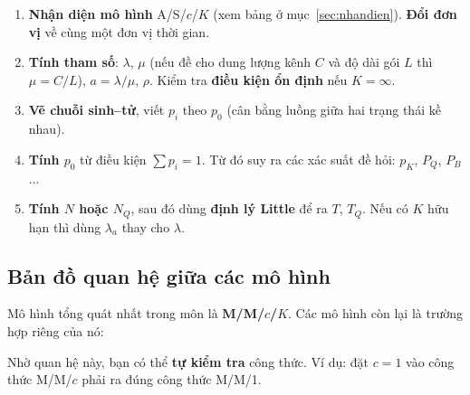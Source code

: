 \begin{tomtat}
\begin{enumerate}[leftmargin=1.6em,label=\textbf{B\arabic*.}]
  \item \textbf{Nhận diện mô hình} A/S/$c$/$K$ (xem bảng ở mục~\ref{sec:nhandien}). \textbf{Đổi đơn vị} về cùng một đơn vị thời gian.
  \item \textbf{Tính tham số}: $\lambda$, $\mu$ (nếu đề cho dung lượng kênh $C$ và độ dài gói $L$ thì $\mu = C/L$), $a=\lambda/\mu$, $\rho$. Kiểm tra \textbf{điều kiện ổn định} nếu $K=\infty$.
  \item \textbf{Vẽ chuỗi sinh--tử}, viết $p_i$ theo $p_0$ (cân bằng luồng giữa hai trạng thái kề nhau).
  \item \textbf{Tính $p_0$} từ điều kiện $\sum p_i = 1$. Từ đó suy ra các xác suất đề hỏi: $p_K$, $P_Q$, $P_B$...
  \item \textbf{Tính $N$ hoặc $N_Q$}, sau đó dùng \textbf{định lý Little} để ra $T$, $T_Q$. Nếu có $K$ hữu hạn thì dùng $\lambda_a$ thay cho $\lambda$.
\end{enumerate}
\end{tomtat}

\subsection{Bản đồ quan hệ giữa các mô hình}

Mô hình tổng quát nhất trong môn là \textbf{M/M/$c$/$K$}. Các mô hình còn lại là trường hợp riêng của nó:

\begin{center}
\end{center}

Nhờ quan hệ này, bạn có thể \textbf{tự kiểm tra} công thức. Ví dụ: đặt $c=1$ vào công thức M/M/$c$ phải ra đúng công thức M/M/1.
